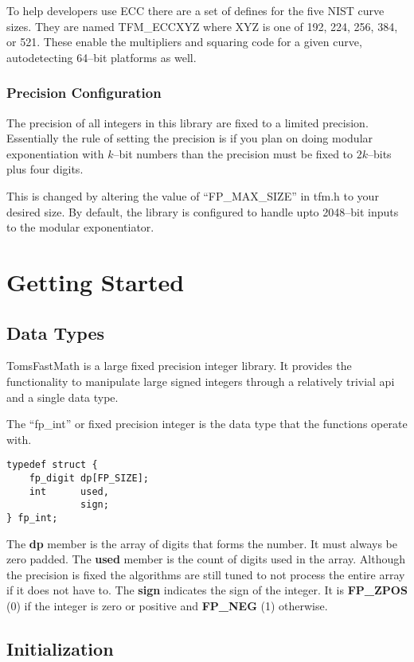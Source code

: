 \documentclass[b5paper]{book}
\begin{document}
To help developers use ECC there are a set of defines for the five NIST curve sizes.  They are named TFM\_ECCXYZ where XYZ is one of 192, 224, 256, 384, or 521.  These
enable the multipliers and squaring code for a given curve, autodetecting 64--bit platforms as well.  

\subsection{Precision Configuration}
The precision of all integers in this library are fixed to a limited precision.  Essentially
the rule of setting the precision is if you plan on doing modular exponentiation with $k$--bit
numbers than the precision must be fixed to $2k$--bits plus four digits.  

This is changed by altering the value of ``FP\_MAX\_SIZE'' in tfm.h to your desired size.  By default, 
the library is configured to handle upto 2048--bit inputs to the modular exponentiator.  

\chapter{Getting Started}
\section{Data Types}
TomsFastMath is a large fixed precision integer library.  It provides the functionality to 
manipulate large signed integers through a relatively trivial api and a single data type.

The ``fp\_int'' or fixed precision integer is the data type that the functions operate with.  

\begin{verbatim}
typedef struct {
    fp_digit dp[FP_SIZE];
    int      used, 
             sign;
} fp_int;
\end{verbatim}

The \textbf{dp} member is the array of digits that forms the number.  It must always be zero 
padded.  The \textbf{used} member is the count of digits used in the array.  Although the 
precision is fixed the algorithms are still tuned to not process the entire array if it 
does not have to.  The \textbf{sign} indicates the sign of the integer.  It is \textbf{FP\_ZPOS} (0)
if the integer is zero or positive and \textbf{FP\_NEG} (1) otherwise.

\section{Initialization}
\end{document}
